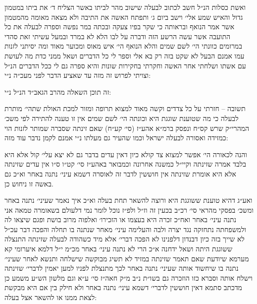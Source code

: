 \documentclass[12pt, openany]{book}
\begin{document}
\begin{multicols}{2}
ואשת כסלות הנ״ל חשב לכתוב לבעלה שישוב מהר לביתו באשר הצליח ד׳ את ביתו במטמון גדול והאיש שמע אלי׳ וישב ביום ג׳ ותפתח האשה את התיבה ולא מצאה מאומה מהמטמון אשר אמר הנואף ובראותה כי שקר בפיו צעקה ובכתה במר נפשה וספרה לבעלה את כל התועבה אשר עשה הרשע הזה ודברה על לבו הלא לא במרד ובמעל עשיתי זאת סהדי במרומים כוונתי הי׳ לשם שמים והלא הנואף הי׳ איש מאוס ומכוער מאוד ומה יסיתני לזנות עמו אמנם הבעל לא שקט בזה רק בא אלי וספר לי כל הדברים ושאל ממני כדת מה לעושת עם אשתו ושלחתי אחר האשה וחקרתי בחקירות שונות והיא ספרה גם לי ככל הדברים הנ״ל וצויתי לפרוש זה מזה עד שאציע הדבר לפני מעכ״ה נ״י: \\\vspace{0pt}

זה תוכן השאלה מהרב הגאב״ד הנ״ל נ״י:\\\vspace{0pt}

תשובה – חזרתי על כל צדדים וקשה מאוד למצוא תרופה ומזור למכת האולת שתהי׳ מותרת לבעלה כי מה שטוענת שוגגת היא וכונתה הי׳ לשם שמים אין זו טענה להתירה לפי משכ׳ המהרי״ק שרש קס״ח ונפסק ברמ״א אהע״ז (סי׳ קע״ח) שאם זינתה שסברה שמותר לזנות הוי כמזידה ואסורה לבעלה ישראל וכמו שהעיר גם מעלתו נ״י אמנם לקמן נדבר עוד מזה:\\\vspace{0pt}

והנה לכאורה הי׳ אפשר למצוא צד קולא כיון דאין עדים בדבר גם לא יצא עלי׳ קול אלא היא בלבד אמרה שזינתה וקיי״ל כמשנה אחרונה וכמבואר באהע״ז סי׳ קט״ו ס״ו אין עדים שזינתה אלא היא אומרת שזינתה אין חוששין לדבר זה לאוסרה דשמא עיני׳ נתנה באחר וא״כ גם באשה זו ניחוש כן.\\\vspace{0pt}

ואע״ג דהיא טוענת ששוגגת היא ורוצה להשאר תחת בעלה וא״כ איך נאמר שעיני׳ נתנה באחר ומשכ׳ בפסקי מהראי סי׳ רכ״ב בכעין זה וז״ל ולפ״ז נוכל לומר נמי דלעולם בשאומרה טמאה אני נתנה עיני׳ באחר ואח״כ זכרה היא בעצמו או הזכירו׳ ואלפוה מרוב בושת ופגם שיצאו לה ולמשפחתה נתחזקה נגד יצרה ולבה והעלימה עיני׳ מאחר שנתנה בו תחלה והפכה דבר עכ״ל לא שייך בזה כיון דבנדון דלפנינו לא הפכה דברי׳ אלא מיד כשהודה לבעלה שזינתה התנצלה ששוגגת היתה ושאל ידחנה א״כ הרי לא נתנה עיני׳ באחר מכ״מ י״ל דלמא איערומי קא מערמא שיודעת שאם תאמר שזינתה במזיד לא תשיג מבוקשה שישלחה ותנשא לאחר שעיני׳ נתנה בו שיחשוד אותה שעיני׳ נתנה באחר לכך מתנצלת לפניו למען יאמין לדברי׳ שזינתה וישלח אותה וסברא כזו הוזכרה גם בשו״ת נ״ב מ״ק חאה״ז סי׳ ע״א וגם מלשון הש״ע משמע כן מדכתב סתמא דאין חוששין לדברי׳ דשמא עיני׳ נתנה באחר ולא חילק בין אם היא מבקשת לצאת ממנו או להשאר אצל בעלה:\\\vspace{0pt}


\end{multicols}
\end{document}
